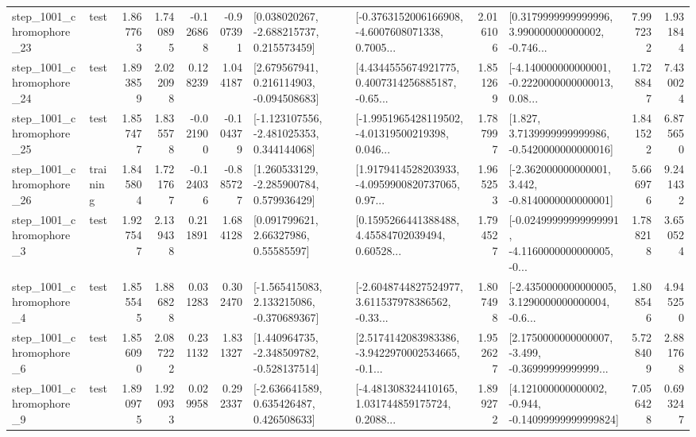 \begin{tabular}{llrrrrllrlrr}
 step\_1001\_chromophore\_23 &      test &      1.867763 &    1.740895 &     -0.126868 & -0.907391 &    [0.038020267, -2.688215737, 0.215573459] &  [-0.3763152006166908, -4.6007608071338, 0.7005... &       2.016106 &  [0.3179999999999996, 3.990000000000002, -0.746... &            7.997232 &          1.931844 \\
 step\_1001\_chromophore\_24 &      test &      1.893859 &    2.022098 &      0.128239 &  1.044187 &    [2.679567941, 0.216114903, -0.094508683] &  [4.4344555674921775, 0.4007314256885187, -0.65... &       1.851269 &  [-4.140000000000001, -0.2220000000000013, 0.08... &            1.728847 &          7.430024 \\
 step\_1001\_chromophore\_25 &      test &      1.857477 &    1.835578 &     -0.021900 & -0.104379 &   [-1.123107556, -2.481025353, 0.344144068] &  [-1.9951965428119502, -4.01319500219398, 0.046... &       1.787997 &   [1.827, 3.7139999999999986, -0.5420000000000016] &            1.841522 &          6.875650 \\
 step\_1001\_chromophore\_26 &  training &      1.845804 &    1.721767 &     -0.124036 & -0.885727 &    [1.260533129, -2.285900784, 0.579936429] &  [1.9179414528203933, -4.0959900820737065, 0.97... &       1.965253 &   [-2.362000000000001, 3.442, -0.8140000000000001] &            5.666976 &          9.241432 \\
  step\_1001\_chromophore\_3 &      test &      1.927547 &    2.139438 &      0.211891 &  1.684128 &       [0.091799621, 2.66327986, 0.55585597] &  [0.1595266441388488, 4.45584702039494, 0.60528... &       1.794527 &  [-0.02499999999999991, -4.1160000000000005, -0... &            1.788218 &          3.650524 \\
  step\_1001\_chromophore\_4 &      test &      1.855545 &    1.886828 &      0.031283 &  0.302470 &   [-1.565415083, 2.133215086, -0.370689367] &  [-2.6048744827524977, 3.611537978386562, -0.33... &       1.807498 &  [-2.4350000000000005, 3.1290000000000004, -0.6... &            1.808546 &          4.945250 \\
  step\_1001\_chromophore\_6 &      test &      1.856090 &    2.087222 &      0.231132 &  1.831327 &   [1.440964735, -2.348509782, -0.528137514] &  [2.5174142083983386, -3.9422970002534665, -0.1... &       1.952627 &  [2.1750000000000007, -3.499, -0.36999999999999... &            5.728409 &          2.881768 \\
  step\_1001\_chromophore\_9 &      test &      1.890975 &    1.920933 &      0.029958 &  0.292337 &    [-2.636641589, 0.635426487, 0.426508633] &  [-4.481308324410165, 1.031744859175724, 0.2088... &       1.899272 &  [4.121000000000002, -0.944, -0.14099999999999824] &            7.056428 &          0.693247 \\

\end{tabular}
